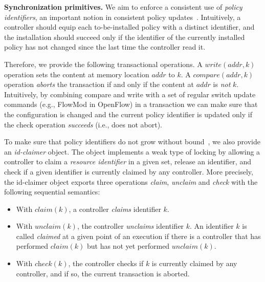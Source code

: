 \documentclass{sig-alternate-2006}
\newcommand{\Nat}{\mathbb{N}}
\newcommand{\claimcheck}{check\xspace}
\newcommand{\compare}{compare\xspace}
\newcommand{\addr}{\textit{addr}\xspace}
\begin{document}
\vspace{1mm}
\noindent\textbf{Synchronization primitives.}
%
We aim to enforce a consistent use of  \emph{policy identifiers},
an important notion in consistent policy updates~\cite{network-update,stn}.
Intuitively, a controller should
equip each to-be-installed policy with a distinct
identifier,
and the installation should succeed only if the identifier of the
currently installed policy has not changed since the last time the
controller read it.

Therefore, we provide the following transactional operations.
A $\textit{write}(\addr,k)$ operation sets the content at memory location
$\addr$ to $k$.
A $\textit{\compare}(\addr,k)$ operation \emph{aborts} the transaction
if and only if the content at
$\addr$ is \emph{not} $k$.
Intuitively, by combining compare and write with a set of regular
switch update commands (e.g., FlowMod in OpenFlow) 
in a transaction  we can make sure that the
configuration is changed and the current policy identifier is updated
only if the check operation \emph{succeeds} (i.e., does not abort).

To make sure that policy identifiers do not grow without bound~\cite{stn}, we
also provide an \emph{id-claimer} object.
The object implements a weak type
of locking by allowing a controller to claim a \emph{resource identifier} in a
given set, release an identifier,  and check if a given identifier
is currently claimed by any controller.
More precisely, the id-claimer object exports three operations \emph{claim},
\emph{unclaim} and \emph{\claimcheck} with the following sequential
semantics:

\begin{itemize}
\item With $\textit{claim}(k)$,
a controller %
\emph{claims}  identifier $k$.

\item With $\textit{unclaim}(k)$, %
the controller %
  \emph{unclaims} identifier $k$.
An identifier $k$ is called \emph{claimed} at a given point of an
execution if there is a controller that has performed $\textit{claim}(k)$
but has not yet performed  $\textit{unclaim}(k)$.

\item With $\textit{\claimcheck}(k)$, the controller checks if $k$ is
  currently claimed by any controller, and if so, the current transaction is
  aborted.

\end{itemize}
\end{document}
